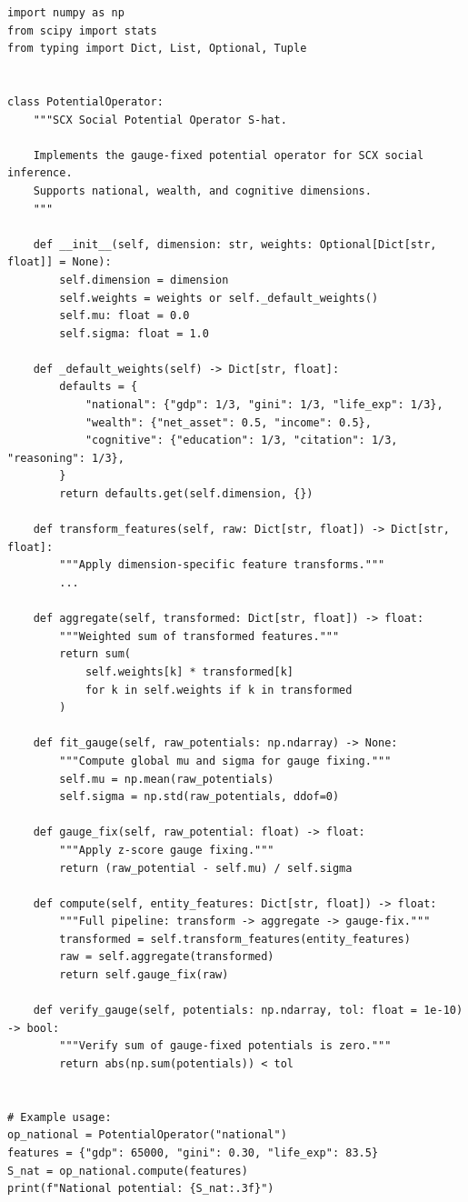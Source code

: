 \documentclass[11pt,a4paper]{article}
\theoremstyle{definition}
\begin{document}
\begin{verbatim}
import numpy as np
from scipy import stats
from typing import Dict, List, Optional, Tuple


class PotentialOperator:
    """SCX Social Potential Operator S-hat.
    
    Implements the gauge-fixed potential operator for SCX social inference.
    Supports national, wealth, and cognitive dimensions.
    """
    
    def __init__(self, dimension: str, weights: Optional[Dict[str, float]] = None):
        self.dimension = dimension
        self.weights = weights or self._default_weights()
        self.mu: float = 0.0
        self.sigma: float = 1.0
    
    def _default_weights(self) -> Dict[str, float]:
        defaults = {
            "national": {"gdp": 1/3, "gini": 1/3, "life_exp": 1/3},
            "wealth": {"net_asset": 0.5, "income": 0.5},
            "cognitive": {"education": 1/3, "citation": 1/3, "reasoning": 1/3},
        }
        return defaults.get(self.dimension, {})
    
    def transform_features(self, raw: Dict[str, float]) -> Dict[str, float]:
        """Apply dimension-specific feature transforms."""
        ...
    
    def aggregate(self, transformed: Dict[str, float]) -> float:
        """Weighted sum of transformed features."""
        return sum(
            self.weights[k] * transformed[k]
            for k in self.weights if k in transformed
        )
    
    def fit_gauge(self, raw_potentials: np.ndarray) -> None:
        """Compute global mu and sigma for gauge fixing."""
        self.mu = np.mean(raw_potentials)
        self.sigma = np.std(raw_potentials, ddof=0)
    
    def gauge_fix(self, raw_potential: float) -> float:
        """Apply z-score gauge fixing."""
        return (raw_potential - self.mu) / self.sigma
    
    def compute(self, entity_features: Dict[str, float]) -> float:
        """Full pipeline: transform -> aggregate -> gauge-fix."""
        transformed = self.transform_features(entity_features)
        raw = self.aggregate(transformed)
        return self.gauge_fix(raw)
    
    def verify_gauge(self, potentials: np.ndarray, tol: float = 1e-10) -> bool:
        """Verify sum of gauge-fixed potentials is zero."""
        return abs(np.sum(potentials)) < tol


# Example usage:
op_national = PotentialOperator("national")
features = {"gdp": 65000, "gini": 0.30, "life_exp": 83.5}
S_nat = op_national.compute(features)
print(f"National potential: {S_nat:.3f}")
\end{verbatim}
\end{document}

